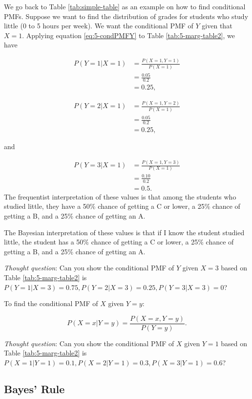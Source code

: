 \documentclass[
]{book}
\begin{document}
We go back to Table \ref{tab:simple-table} as an example on how to find conditional PMFs. Suppose we want to find the distribution of grades for students who study little (0 to 5 hours per week). We want the conditional PMF of \(Y\) given that \(X=1\). Applying equation \eqref{eq:5-condPMFY} to Table \ref{tab:5-marg-table2}, we have

\[
\begin{split}
P(Y=1|X=1) &= \frac{P(X=1, Y=1)}{P(X=1)}\\
 &= \frac{0.05}{0.2} \\
&= 0.25,
\end{split}
\]

\[
\begin{split}
P(Y=2|X=1) &= \frac{P(X=1, Y=2)}{P(X=1)}\\
 &= \frac{0.05}{0.2} \\
&= 0.25,
\end{split}
\]

and

\[
\begin{split}
P(Y=3|X=1) &= \frac{P(X=1, Y=3)}{P(X=1)}\\
 &= \frac{0.10}{0.2} \\
&= 0.5.
\end{split}
\]
The frequentist interpretation of these values is that among the students who studied little, they have a 50\% chance of getting a C or lower, a 25\% chance of getting a B, and a 25\% chance of getting an A.

The Bayesian interpretation of these values is that if I know the student studied little, the student has a 50\% chance of getting a C or lower, a 25\% chance of getting a B, and a 25\% chance of getting an A.

\emph{Thought question}: Can you show the conditional PMF of \(Y\) given \(X=3\) based on Table \ref{tab:5-marg-table2} is \(P(Y=1|X=3) = 0.75, P(Y=2|X=3) = 0.25, P(Y=3|X=3) = 0\)?

To find the conditional PMF of \(X\) given \(Y=y\):

\begin{equation} 
P(X=x|Y=y) = \frac{P(X=x, Y=y)}{P(Y=y)}.
\label{eq:5-condPMFX}
\end{equation}

\emph{Thought question}: Can you show the conditional PMF of \(X\) given \(Y=1\) based on Table \ref{tab:5-marg-table2} is \(P(X=1|Y=1) = 0.1, P(X=2|Y=1) = 0.3, P(X=3|Y=1) = 0.6\)?

\hypertarget{bayes-rule-1}{%
\subsection{Bayes' Rule}\label{bayes-rule-1}}
\end{document}
